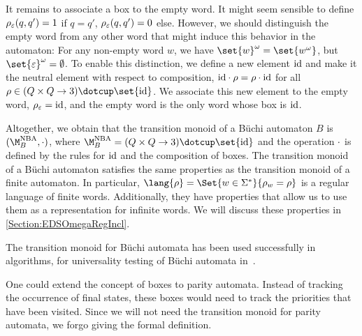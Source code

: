 \documentclass[../../diss.tex]{subfiles}
\begin{document}
It remains to associate a box to the empty word.
It might seem sensible to define $\tbox{\eps}(q,q') = 1$ if $q = q'$, $\tbox{\eps}(q,q') = 0$ else.
However, we should distinguish the empty word from any other word that might induce this behavior in the automaton:
For any non-empty word $w$, we have $\set{w}^\omega = \set{ w^\omega}$, but $\set{\eps}^\omega = \emptyset$.
To enable this distinction, we define a new element $\text{id}$ and make it the neutral element with respect to composition, $\text{id} \cdot \rho = \rho \cdot \text{id}$ for all $\rho \in (Q \times Q \to 3) \dotcup \set{\id}$.
We associate this new element to the empty word, $\tbox{\eps} = \id$, and the empty word is the only word whose box is $\text{id}$.

Altogether, we obtain that the transition monoid of a Büchi automaton $B$ is $({\nbatransmonoid{B}}, \relcomp)$, where ${\nbatransmonoid{B}} = (Q \times Q \to 3) \dotcup \set{\id}$ and the operation $\cdot$ is defined by the rules for $\text{id}$ and the composition of boxes.
The transition monoid of a Büchi automaton satisfies the same properties as the transition monoid of a finite automaton.
In particular, $\lang{\rho} = \Set{ w \in \Sigma^*}{\tbox{w} = \rho}$ is a regular language of finite words.
Additionally, they have properties that allow us to use them as a representation for infinite words.
We will discuss these properties in \cref{Section:EDSOmegaRegIncl}.

The transition monoid for Büchi automata has been used successfully in algorithms, \eg for universality testing of Büchi automata in~\cite{FogartyV10,AbdullaCCHHMV10,AbdullaCCHHMV11}.

One could extend the concept of boxes to parity automata.
Instead of tracking the occurrence of final states, these boxes would need to track the priorities that have been visited.
Since we will not need the transition monoid for parity automata, we forgo giving the formal definition.
\end{document}
